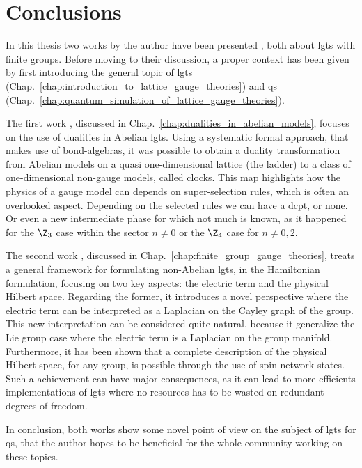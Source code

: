 \chapter{Conclusions}
\label{chap:conclusions}

In this thesis two works by the author have been presented \cite{pradhan2022ladder, pradhan_unpublished}, both about \acp{lgt} with finite groups.
Before moving to their discussion, a proper context has been given by first introducing the general topic of \acp{lgt} (Chap.~\ref{chap:introduction_to_lattice_gauge_theories}) and \acl{qs} (Chap.~\ref{chap:quantum_simulation_of_lattice_gauge_theories}).

\medskip

The first work \cite{pradhan2022ladder}, discussed in Chap.~\ref{chap:dualities_in_abelian_models}, focuses on the use of dualities in Abelian \acp{lgt}.
Using a systematic formal approach, that makes use of bond-algebras, it was possible to obtain a duality transformation from Abelian models on a quasi one-dimensional lattice (the ladder) to a class of one-dimensional non-gauge models, called \aclp{clock}.
This map highlights how the physics of a gauge model can depends on super-selection rules, which is often an overlooked aspect.
Depending on the selected rules we can have a \acl{dcpt}, or none.
Or even a new intermediate phase for which not much is known, as it happened for the $\Z_3$ case within the sector $n \neq 0$ or the $\Z_4$ case for $n \neq 0, 2$.

\smallskip

The second work \cite{pradhan_unpublished}, discussed in Chap.~\ref{chap:finite_group_gauge_theories}, treats a general framework for formulating non-Abelian \acp{lgt}, in the Hamiltonian formulation, focusing on two key aspects: the electric term and the physical Hilbert space.
Regarding the former, it introduces a novel perspective where the electric term can be interpreted as a Laplacian on the Cayley graph of the group.
This new interpretation can be considered quite natural, because it generalize the Lie group case where the electric term is a Laplacian on the group manifold.
Furthermore, it has been shown that a complete description of the physical Hilbert space, for any group, is possible through the use of spin-network states.
Such a achievement can have major consequences, as it can lead to more efficients implementations of \acp{lgt} where no resources has to be wasted on redundant degrees of freedom.

\smallskip

In conclusion, both works show some novel point of view on the subject of \acp{lgt} for \acl{qs}, that the author hopes to be beneficial for the whole community working on these topics.
